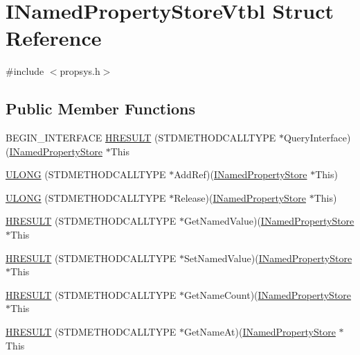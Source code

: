 \hypertarget{struct_i_named_property_store_vtbl}{}\section{I\+Named\+Property\+Store\+Vtbl Struct Reference}
\label{struct_i_named_property_store_vtbl}


{\ttfamily \#include $<$propsys.\+h$>$}

\subsection*{Public Member Functions}
\begin{DoxyCompactItemize}
\item 
B\+E\+G\+I\+N\+\_\+\+I\+N\+T\+E\+R\+F\+A\+CE \hyperlink{struct_i_named_property_store_vtbl_a3d893bd046299cbeb10fe9d993e4c158}{H\+R\+E\+S\+U\+LT} (S\+T\+D\+M\+E\+T\+H\+O\+D\+C\+A\+L\+L\+T\+Y\+PE $\ast$Query\+Interface)(\hyperlink{propsys_8h_ad78560183aa79c1a851febcac7e9b180}{I\+Named\+Property\+Store} $\ast$This
\item 
\hyperlink{struct_i_named_property_store_vtbl_ac4749b44ee0c432f24b5dbc156dbab85}{U\+L\+O\+NG} (S\+T\+D\+M\+E\+T\+H\+O\+D\+C\+A\+L\+L\+T\+Y\+PE $\ast$Add\+Ref)(\hyperlink{propsys_8h_ad78560183aa79c1a851febcac7e9b180}{I\+Named\+Property\+Store} $\ast$This)
\item 
\hyperlink{struct_i_named_property_store_vtbl_a13018a3a251c43f316da110ecd7a1840}{U\+L\+O\+NG} (S\+T\+D\+M\+E\+T\+H\+O\+D\+C\+A\+L\+L\+T\+Y\+PE $\ast$Release)(\hyperlink{propsys_8h_ad78560183aa79c1a851febcac7e9b180}{I\+Named\+Property\+Store} $\ast$This)
\item 
\hyperlink{struct_i_named_property_store_vtbl_a0ed76b62c817c827256563a329622e18}{H\+R\+E\+S\+U\+LT} (S\+T\+D\+M\+E\+T\+H\+O\+D\+C\+A\+L\+L\+T\+Y\+PE $\ast$Get\+Named\+Value)(\hyperlink{propsys_8h_ad78560183aa79c1a851febcac7e9b180}{I\+Named\+Property\+Store} $\ast$This
\item 
\hyperlink{struct_i_named_property_store_vtbl_a46df81ad7c9805294d96c405a49fd5d7}{H\+R\+E\+S\+U\+LT} (S\+T\+D\+M\+E\+T\+H\+O\+D\+C\+A\+L\+L\+T\+Y\+PE $\ast$Set\+Named\+Value)(\hyperlink{propsys_8h_ad78560183aa79c1a851febcac7e9b180}{I\+Named\+Property\+Store} $\ast$This
\item 
\hyperlink{struct_i_named_property_store_vtbl_a40fca28817472f3fdc753da73063eca6}{H\+R\+E\+S\+U\+LT} (S\+T\+D\+M\+E\+T\+H\+O\+D\+C\+A\+L\+L\+T\+Y\+PE $\ast$Get\+Name\+Count)(\hyperlink{propsys_8h_ad78560183aa79c1a851febcac7e9b180}{I\+Named\+Property\+Store} $\ast$This
\item 
\hyperlink{struct_i_named_property_store_vtbl_a1966f36ebf55ed8b06cf18cf75f54e53}{H\+R\+E\+S\+U\+LT} (S\+T\+D\+M\+E\+T\+H\+O\+D\+C\+A\+L\+L\+T\+Y\+PE $\ast$Get\+Name\+At)(\hyperlink{propsys_8h_ad78560183aa79c1a851febcac7e9b180}{I\+Named\+Property\+Store} $\ast$This
\end{DoxyCompactItemize}
